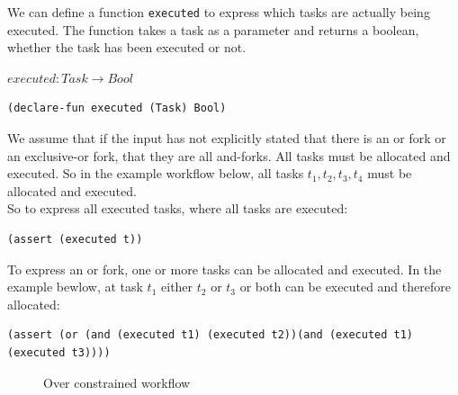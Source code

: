 \documentclass[a4paper]{report}
\begin{document}
We can define a function \texttt{executed} to express which tasks are actually being executed. The function takes a task as a parameter and returns a boolean, whether the task has been executed or not.
\begin{center}
$executed : Task \longrightarrow Bool$
\end{center}
\begin{lstlisting}[frame=single]
(declare-fun executed (Task) Bool)
\end{lstlisting}

We assume that if the input has not explicitly stated that there is an or fork or an exclusive-or fork, that they are all and-forks. All tasks must be allocated and executed. So in the example workflow below, all tasks $t_1, t_2, t_3, t_4$ must be allocated and executed. \\

So to express all executed tasks, where all tasks are executed:
\begin{lstlisting}[frame=single]
(assert (executed t))
\end{lstlisting}
\begin{center}
\end{center}

To express an or fork, one or more tasks can be allocated and executed. In the example bewlow, at task $t_1$ either $t_2$ or $t_3$ or both can be executed and therefore allocated:
\begin{lstlisting}[frame=single]
(assert (or (and (executed t1) (executed t2))(and (executed t1) (executed t3))))
\end{lstlisting}
\begin{figure}[!htb]
\centering
{}
\caption{Over constrained workflow}
\label{fig:Over constrained workflow}
\end{figure}
\end{document}
